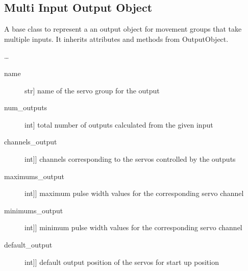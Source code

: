 \documentclass[letterpaper,10pt,english]{sphinxmanual}
\begin{document}
\subsection{Multi Input Output Object}
\label{\detokenize{base:module-MultiInputOutputObject}}\label{\detokenize{base:multi-input-output-object}}

\begin{fulllineitems}
\label{\detokenize{base:MultiInputOutputObject.MultiInputOutputObject}}
\sphinxAtStartPar
A base class to represent a an output object for movement groups that take multiple inputs.
It inherits attributes and methods from OutputObject.

\sphinxAtStartPar
…

\sphinxAtStartPar
{}
\begin{description}
\item[{name}] \leavevmode{[}str{]}
\sphinxAtStartPar
name of the servo group for the output

\item[{num\_outputs}] \leavevmode{[}int{]}
\sphinxAtStartPar
total number of outputs calculated from the given input

\item[{channels\_output}] \leavevmode{[}{[}int{]}{]}
\sphinxAtStartPar
channels corresponding to the servos controlled by the outputs

\item[{maximums\_output}] \leavevmode{[}{[}int{]}{]}
\sphinxAtStartPar
maximum pulse width values for the corresponding servo channel

\item[{minimums\_output}] \leavevmode{[}{[}int{]}{]}
\sphinxAtStartPar
minimum pulse width values for the corresponding servo channel

\item[{default\_output}] \leavevmode{[}{[}int{]}{]}
\sphinxAtStartPar
default output position of the servos for start up position


\end{description}
\end{fulllineitems}
\end{document}
